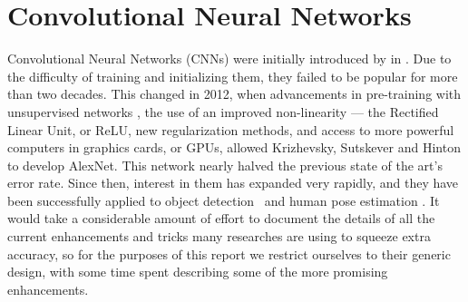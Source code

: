 % 
% 
\section{Convolutional Neural Networks}\label{sec:cnns}
  Convolutional Neural Networks (CNNs) were initially introduced by \citet{lecun_backpropagation_1989} in
  \citep{lecun_backpropagation_1989}. Due to the difficulty of training and
  initializing them, they failed to be popular for more than two decades.  This
  changed in 2012, when advancements in pre-training with unsupervised networks
  \citep{bengio_greedy_2007}, the use of an improved non-linearity --- the Rectified Linear
  Unit, or ReLU, new regularization methods\citep{hinton_improving_2012}, and
  access to more powerful computers in graphics cards, or GPUs, allowed
  Krizhevsky, Sutskever and Hinton  to develop
  AlexNet\citep{krizhevsky_imagenet_2012}. This network nearly halved the
  previous state of the art's error rate.  Since then, interest in them has
  expanded very rapidly, and they have been successfully applied to object
  detection~\citep{ren_object_2015} and human pose estimation
  \citep{tompson_efficient_2015}. It would take a considerable amount of effort
  to document the details of all the current enhancements and tricks many
  researches are using to squeeze extra accuracy, so for the purposes of this
  report we restrict ourselves to their generic design, with some time spent
  describing some of the more promising enhancements. 
  

